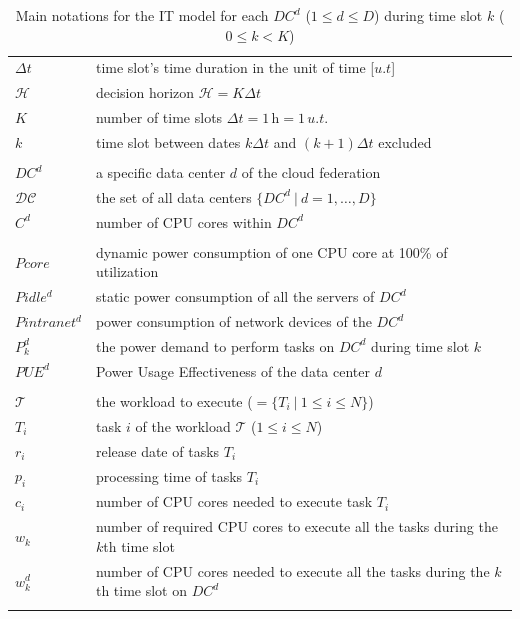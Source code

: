 \begin{table}[!t]
\caption{Main notations for the IT model for each $DC^d$ ($1\leq d\leq D$) during time slot $k$ ($0\leq k< K$)\label{table:variablesIT}}
\begin{center}
\begin{tabular}{l p{6cm}}


$\Delta t$ & time slot's time duration in the unit of time [$u.t$] \\
$\mathcal{H}$ & decision horizon $\mathcal{H} = K\Delta t$ \\
$K$ & number of time slots $\Delta t = 1\,\text{h} = 1\,u.t.$ \\ 
$k$ & time slot between dates $k\Delta t$ and $(k+1)\Delta t$ excluded \\ \\
$DC^d$ & a specific data center $d$ of the cloud federation \\
$\mathcal{DC}$ & the set of all data centers $\{DC^d \ | \ d=1, \ldots, D\}$ \\
$C^d$ & number of CPU cores within $DC^d$ \\
\\
$Pcore$ & dynamic power consumption of one CPU core at 100\% of utilization \\
$Pidle^d$ & static power consumption of all the servers of $DC^d$ \\
$Pintranet^d$ & power consumption of network devices of the $DC^d$  \\
$P_k^d$ & the power demand to perform tasks on $DC^d$ during time slot $k$ \\ 
$PUE^d$ & Power Usage Effectiveness of the data center $d$\\ 
\\
$\mathcal{T}$ & the workload to execute ($ = \{ T_i\ |\ 1\leq i\leq N\}$) \\
$T_i$ & task $i$ of the workload $\mathcal{T}$ ($1\leq i\leq N$) \\
$r_i$ & release date of tasks $T_i$\\
$p_i$ & processing time of tasks $T_i$\\
$c_i$ & number of CPU cores needed to execute task $T_i$\\ 
$w_k$ & number of required CPU cores to execute all the tasks during the $k$th time slot \\
$w_k^d$ & number of CPU cores needed to execute all the tasks during the $k$th time slot on $DC^d$\\ \\\end{tabular}
\end{center}
\end{table}




